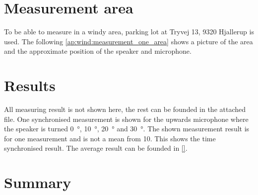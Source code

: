 \section*{Measurement area}
To be able to measure in a windy area, parking lot at Tryvej 13, 9320 Hjallerup is used. The following \autoref{ap:wind:measurement_one_area} shows a picture of the area and the approximate position of the speaker and microphone.


\section*{Results}

All measuring result is not shown here, the rest can be founded in the attached file. One synchronised measurement is shown for the upwards microphone where the speaker is turned \SI{0}{\degree}, \SI{10}{\degree}, \SI{20}{\degree} and \SI{30}{\degree}. The shown measurement result is for one measurement and is not a mean from 10. This shows the time synchronised result. The average result can be founded in \autoref{}.








\section*{Summary}